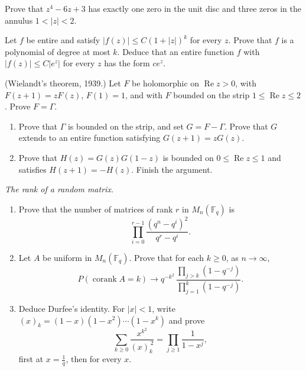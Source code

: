 \begin{exercise}[$\star$]\label{ex:rouche}
Prove that $z^4-6z+3$ has exactly one zero in the unit disc and three zeros in the annulus $1<|z|<2$.
\end{exercise}

\begin{exercise}[$\star\star$]\label{ex:polygrowth}
Let $f$ be entire and satisfy $|f(z)|\le C(1+|z|)^k$ for every $z$. Prove that $f$ is a polynomial of degree at most $k$. Deduce that an entire function $f$ with $|f(z)|\le C|e^z|$ for every $z$ has the form $ce^z$.
\end{exercise}

\begin{exercise}[$\star\star\star$]\label{ex:wielandt}
(Wielandt's theorem, 1939.) Let $F$ be holomorphic on $\operatorname{Re}z>0$, with $F(z+1)=zF(z)$, $F(1)=1$, and with $F$ bounded on the strip $1\le\operatorname{Re}z\le2$. Prove $F=\Gamma$.
\begin{enumerate}[label=(\alph*)]
\item Prove that $\Gamma$ is bounded on the strip, and set $G=F-\Gamma$. Prove that $G$ extends to an entire function satisfying $G(z+1)=zG(z)$.
\item Prove that $H(z)=G(z)G(1-z)$ is bounded on $0\le\operatorname{Re}z\le1$ and satisfies $H(z+1)=-H(z)$. Finish the argument.
\end{enumerate}
\end{exercise}

\begin{exercise}[$\star\star$]\label{pb:rankdist}
\emph{The rank of a random matrix.}
\begin{enumerate}[label=(\alph*)]
\item Prove that the number of matrices of rank $r$ in $M_n(\mathbb F_q)$ is
\[
\prod_{i=0}^{r-1}\frac{(q^n-q^i)^2}{q^r-q^i}.
\]
\item Let $A$ be uniform in $M_n(\mathbb F_q)$. Prove that for each $k\ge0$, as $n\to\infty$,
\[
P(\operatorname{corank}A=k)\longrightarrow q^{-k^2}\,\frac{\prod_{j>k}(1-q^{-j})}{\prod_{j=1}^k(1-q^{-j})}.
\]
\item Deduce Durfee's identity. For $|x|<1$, write $(x)_k=(1-x)(1-x^2)\cdots(1-x^k)$ and prove
\[
\sum_{k\ge0}\frac{x^{k^2}}{(x)_k^{\,2}}=\prod_{j\ge1}\frac1{1-x^j},
\]
first at $x=\frac1q$, then for every $x$.
\end{enumerate}
\end{exercise}

